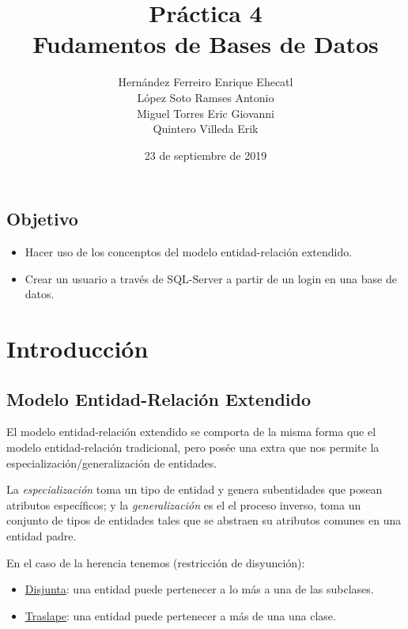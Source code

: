 \documentclass[12pt, letterpaper]{article}
\author{Hernández Ferreiro Enrique Ehecatl \\
        López Soto Ramses Antonio \\
        Miguel Torres Eric Giovanni \\
        Quintero Villeda Erik}
\title{Práctica 4 \\
       {\small Fudamentos de Bases de Datos}}
\date{23 de septiembre de 2019}
\begin{document}
    \maketitle

    \subsection*{Objetivo}

        \begin{itemize}
            \item   Hacer uso de los concenptos del modelo entidad-relación 
                    extendido.
            \item   Crear un usuario a través de SQL-Server a partir de un login 
                    en una base de datos.
        \end{itemize}

    \section*{Introducción}

        \subsection*{Modelo Entidad-Relación Extendido}
        El modelo entidad-relación extendido se comporta de la misma forma que
        el modelo entidad-relación tradicional, pero posée una extra que nos
        permite la especialización/generalización de entidades. \vspace{.3cm}

        La \textit{especialización} toma un tipo de entidad y genera subentidades
        que posean atributos específicos; y la \textit{generalización} es el 
        el proceso inverso, toma un conjunto de tipos de entidades tales que se
        abstraen su atributos comunes en una entidad padre.\vspace{.3cm}
        
        En el caso de la herencia tenemos (restricción de disyunción):

        \begin{itemize}
            \item \underline{Disjunta}: una entidad puede pertenecer a lo más a
                                        una de las subclases.
            \item \underline{Traslape}: una entidad puede pertenecer a más de una
                                        una clase.
        \end{itemize}
\end{document}
